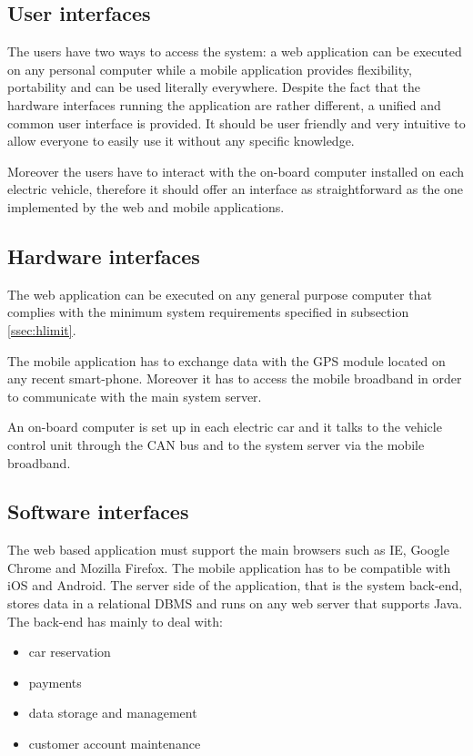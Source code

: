 \subsection{User interfaces}
The users have two ways to access the system: a web application can be executed on any personal computer while a mobile application provides flexibility, portability and can be used literally everywhere. Despite the fact that the hardware interfaces running the application are rather different, a unified and common user interface is provided. It should be user friendly and very intuitive to allow everyone to easily use it without any specific knowledge.

Moreover the users have to interact with the on-board computer installed on each electric vehicle, therefore it should offer an interface as straightforward as the one implemented by the web and mobile applications.

\subsection{Hardware interfaces}
The web application can be executed on any general purpose computer that complies with the minimum system requirements specified in subsection \ref{ssec:hlimit}.

The mobile application has to exchange data with the GPS module located on any recent smart-phone. Moreover it has to access the mobile broadband in order to communicate with the main system server.

An on-board computer is set up in each electric car and it talks to the vehicle control unit through the CAN bus and to the system server via the mobile broadband.

\subsection{Software interfaces}
The web based application must support the main browsers such as IE, Google Chrome and Mozilla Firefox. The mobile application has to be compatible with iOS and Android. The server side of the application, that is the system back-end, stores data in a relational DBMS and runs on any web server that supports Java.
The back-end has mainly to deal with:
\begin{itemize}
\item car reservation
\item payments
\item data storage and management
\item customer account maintenance
\end{itemize}